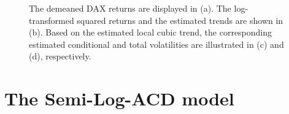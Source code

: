 \begin{figure}[H]
	\caption{\label{fig:ex3} The demeaned DAX returns are displayed in (a). The log-transformed squared returns and the estimated trends are shown in (b). Based on the estimated local cubic trend, the corresponding estimated conditional and total volatilities are illustrated in (c) and (d), respectively.}
\end{figure}

\section{The Semi-Log-ACD model} \label{sec:SemiLogACD}

